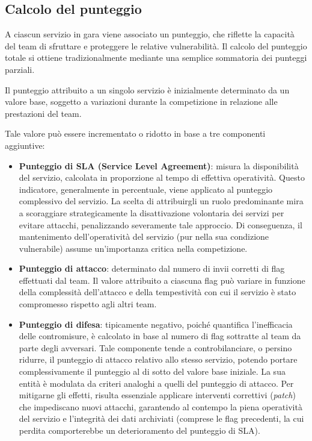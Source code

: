 \subsection{Calcolo del punteggio}

A ciascun servizio in gara viene associato un punteggio, che riflette la capacità del team di sfruttare e proteggere le relative vulnerabilità. Il calcolo del punteggio totale si ottiene tradizionalmente mediante una semplice sommatoria dei punteggi parziali.

Il punteggio attribuito a un singolo servizio è inizialmente determinato da un valore base, soggetto a variazioni durante la competizione in relazione alle prestazioni del team.

Tale valore può essere incrementato o ridotto in base a tre componenti aggiuntive:

\begin{itemize}
    \setlength{\itemsep}{2pt}
    \setlength{\parskip}{2pt}
    \item \textbf{Punteggio di SLA (Service Level Agreement)}: misura la disponibilità del servizio, calcolata in proporzione al tempo di effettiva operatività.
    Questo indicatore, generalmente in percentuale, viene applicato al punteggio complessivo del servizio. La scelta di attribuirgli un ruolo predominante mira a scoraggiare strategicamente la disattivazione volontaria dei servizi per evitare attacchi, penalizzando severamente tale approccio. Di conseguenza, il mantenimento dell’operatività del servizio (pur nella sua condizione vulnerabile) assume un’importanza critica nella competizione.
    \item \textbf{Punteggio di attacco}: determinato dal numero di invii corretti di flag effettuati dal team. Il valore attribuito a ciascuna flag può variare in funzione della complessità dell’attacco e della tempestività con cui il servizio è stato compromesso rispetto agli altri team.
    \item \textbf{Punteggio di difesa}: tipicamente negativo, poiché quantifica l’inefficacia delle contromisure, è calcolato in base al numero di flag sottratte al team da parte degli avversari. Tale componente tende a controbilanciare, o persino ridurre, il punteggio di attacco relativo allo stesso servizio, potendo portare complessivamente il punteggio al di sotto del valore base iniziale. La sua entità è modulata da criteri analoghi a quelli del punteggio di attacco. Per mitigarne gli effetti, risulta essenziale applicare interventi correttivi (\emph{patch}) che impediscano nuovi attacchi, garantendo al contempo la piena operatività del servizio e l’integrità dei dati archiviati (comprese le flag precedenti, la cui perdita comporterebbe un deterioramento del punteggio di SLA).
\end{itemize}

